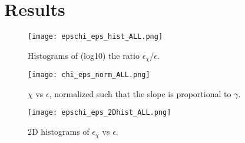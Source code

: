 \documentclass[11pt]{article}
\begin{document}
\section{Results}


\begin{figure}[htbp]
\texttt{[image: epschi\_eps\_hist\_ALL.png]}
\caption{Histograms of (log10) the ratio $\epsilon_{\chi}/\epsilon$.}
\label{}
\end{figure}

\begin{figure}[htbp]
\texttt{[image: chi\_eps\_norm\_ALL.png]}
\caption{$\chi$ vs $\epsilon$, normalized such that the slope is proportional to $\gamma$.}
\label{}
\end{figure}

\begin{figure}[htbp]
\texttt{[image: epschi\_eps\_2Dhist\_ALL.png]}
\caption{2D histograms of $\epsilon_{\chi}$ vs $\epsilon$.}
\label{}
\end{figure}
\end{document}
